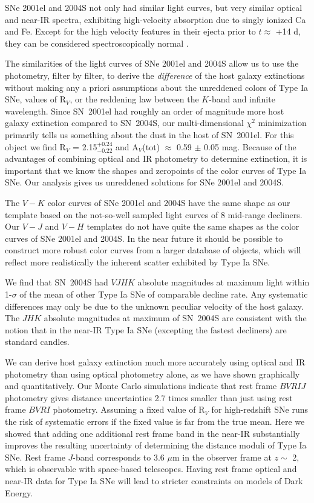 \documentclass[12pt,preprint,psfig,epsf]{aastex}
\newcommand{\bvri}{\protect\hbox{$BV\!RI$} }
\newcommand{\bvrij}{\protect\hbox{$BV\!RIJ$} }
\begin{document}
SNe 2001el and 2004S not only had similar light curves, but very similar
optical and near-IR spectra, exhibiting high-velocity absorption due to singly
ionized Ca and Fe.  Except for the high velocity features in their ejecta prior to $t
\approx$ +14 d, they can be considered spectroscopically normal \citep{Bra_etal06}.

The similarities of the light curves of SNe 2001el and 2004S allow us to use the
photometry, filter by filter, to derive the {\em difference} of the host galaxy
extinctions without making any a priori assumptions about the unreddened
colors of Type Ia SNe, values of R$_V$, or the reddening law between the $K$-band
and infinite wavelength.  Since SN~2001el had roughly an order of magnitude more
host galaxy extinction compared to SN~2004S, our multi-dimensional $\chi^2$
minimization primarily tells us something about the dust in the host of SN~2001el.  
For this object we find R$_V$ = 2.15$^{+0.24}_{-0.22}$ and 
A$_V$(tot) $\approx$ 0.59 $\pm$ 0.05 mag.  Because of the
advantages of combining optical and IR photometry to determine extinction, it is
important that we know the shapes and zeropoints of the color curves of Type Ia
SNe.  Our analysis gives us unreddened solutions for SNe 2001el and 2004S.

The $V-K$ color curves of SNe 2001el and 2004S have the same shape as
our template based on the not-so-well sampled light curves of 8 mid-range
decliners.  Our $V-J$ and $V-H$ templates do not have quite the same
shapes as the color curves of SNe 2001el and 2004S.  In the near future
it should be possible to construct more robust color curves from a larger
database of objects, which will reflect more realistically the inherent
scatter exhibited by Type Ia SNe.

We find that SN~2004S had $VJHK$ absolute magnitudes at maximum light within
1-$\sigma$ of the mean of other Type Ia SNe of comparable decline
rate. Any systematic differences may only be due to the unknown peculiar
velocity of the host galaxy.  The $JHK$ absolute magnitudes at maximum of
SN~2004S are consistent with the notion that in the near-IR Type Ia SNe
(excepting the fastest decliners) are standard candles.

We can derive host galaxy extinction much more accurately using optical and IR
photometry than using optical photometry alone, as we have shown graphically and
quantitatively.  Our Monte Carlo simulations indicate that rest frame \bvrij
photometry gives distance uncertainties 2.7 times smaller than just using rest
frame \bvri photometry.  Assuming a fixed value of R$_V$ for high-redshift
SNe runs the risk of systematic errors if the fixed value is far from the 
true mean.  Here we showed that adding one additional rest frame band in the
near-IR substantially improves the resulting uncertainty of determining
the distance moduli of Type Ia SNe.  Rest frame $J$-band
corresponds to 3.6 $\mu$m in the observer frame at $z \sim$ 2, which is
observable with space-based telescopes.  Having rest frame optical and near-IR
data for Type Ia SNe will lead to stricter constraints on models of Dark Energy.
\end{document}
